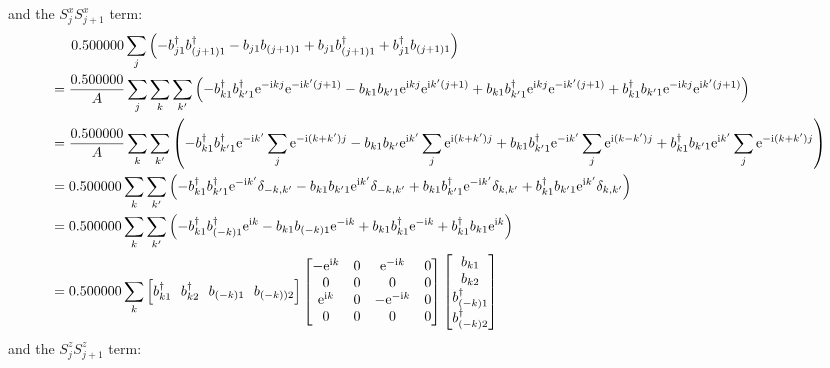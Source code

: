 \documentclass[letter]{article}
\newcommand{\e}{\mathrm{e}}
\newcommand{\ii}{\mathrm{i}}
\begin{document}
and the $S_j^x S_{j+1}^x$ term:
$$\begin{aligned}
    & \indent  0.500000\sum_{j}\left(-b_{j1}^{\dagger}b_{(j+1)1}^{\dagger}-b_{j1}b_{(j+1)1}+b_{j1}b_{(j+1)1}^{\dagger}+b_{j1}^{\dagger}b_{(j+1)1}\right)\\
    &=\frac{0.500000}{A}\sum_{j}\sum_{k}\sum_{k'}\left(-b_{k1}^{\dagger}b_{k'1}^{\dagger}\e^{-\ii kj}\e^{-\ii k'(j+1)}-b_{k1}b_{k'1}\e^{\ii kj}\e^{\ii k'(j+1)}+b_{k1}b_{k'1}^{\dagger}\e^{\ii kj}\e^{-\ii k'(j+1)}+b_{k1}^{\dagger}b_{k'1}\e^{-\ii kj}\e^{\ii k'(j+1)}\right)\\
    &=\frac{0.500000}{A}\sum_{k}\sum_{k'}\left(-b_{k1}^{\dagger}b_{k'1}^{\dagger}\e^{-\ii k'}\sum_j \e^{-\ii (k+k')j}-b_{k1}b_{k'}\e^{\ii k'}\sum_j \e^{\ii (k+k')j}+b_{k1}b_{k'1}^{\dagger}\e^{-\ii k'}\sum_j \e^{\ii (k-k')j}+b_{k1}^{\dagger}b_{k'1}\e^{\ii k'}\sum_j \e^{-\ii (k+k')j}\right)\\
    &=0.500000\sum_k\sum_{k'}\left(-b_{k1}^{\dagger}b_{k'1}^{\dagger}\e^{-\ii k'}\delta_{-k,k'}-b_{k1}b_{k'1}\e^{\ii k'}\delta_{-k,k'}+b_{k1}b_{k'1}^{\dagger}\e^{-\ii k'}\delta_{k,k'}+b_{k1}^{\dagger}b_{k'1}\e^{\ii k'}\delta_{k,k'}\right)\\
    &=0.500000\sum_k\sum_{k'}\left(-b_{k1}^{\dagger}b_{(-k)1}^{\dagger}\e^{\ii k}-b_{k1}b_{(-k)1}\e^{-\ii k}+b_{k1}b_{k1}^{\dagger}\e^{-\ii k}+b_{k1}^{\dagger}b_{k1}\e^{\ii k}\right)\\
    &=0.500000\sum_k \left[
      b_{k1}^{\dagger} \ \ 
      b_{k2}^{\dagger}\  \ 
      b_{(-k)1}\ \ 
      b_{(-k))2}\right]
     \begin{bmatrix}
          -\e^{\ii k} & 0 & \e^{-\ii k} & 0 \\
         0 &  0 & 0 &0 \\
         \e^{\ii k} &  0 & -\e^{-\ii k} &0\\
          0 & 0 & 0& 0
          \end{bmatrix}\begin{bmatrix}
              b_{k1}  \\
              b_{k2}  \\
              b_{(-k)1}^{\dagger}\\
              b_{(-k)2}^{\dagger}
              \end{bmatrix}
  \end{aligned}
  $$
  and the $S_j^z S_{j+1}^z$ term:
\end{document}
